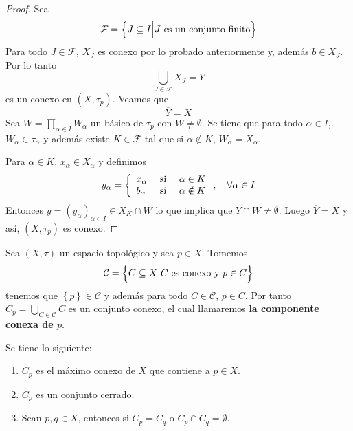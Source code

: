 \documentclass[12pt]{report}
\theoremstyle{largebreak}
\newcommand{\Cls}[1]{\ensuremath{\overline{#1}}}
\begin{document}
\begin{proof}
        Sea
        \begin{equation*}
            \mathcal{F}=\left\{J\subseteq I\Big|J\textup{ es un conjunto finito} \right\}
        \end{equation*}
        Para todo $J\in\mathcal{F}$, $X_J$ es conexo por lo probado anteriormente y, además $b\in X_J$. Por lo tanto
        \begin{equation*}
            \bigcup_{ J\in\mathcal{F}}X_J=Y
        \end{equation*}
        es un conexo en $(X,\tau_p)$. Veamos que
        \begin{equation*}
            \Cls{Y}=X
        \end{equation*}
        Sea $W=\prod_{\alpha\in I}W_\alpha$ un básico de $\tau_p$ con $W\neq\emptyset$. Se tiene que para todo $\alpha\in I$, $W_\alpha\in\tau_\alpha$ y además existe $K\in\mathcal{F}$ tal que si $\alpha\notin K$, $W_\alpha=X_\alpha$.

        Para $\alpha\in K$, $x_\alpha\in X_\alpha$ y definimos
        \begin{equation*}
            y_\alpha=\left\{
                \begin{array}{lcr}
                    x_\alpha & \textup{ si } & \alpha\in K\\
                    b_\alpha & \textup{ si } & \alpha\notin K\\
                \end{array}
            \right.,\quad\forall\alpha\in I
        \end{equation*}
        Entonces $y=(y_\alpha)_{\alpha\in I}\in X_K\cap W$ lo que implica que $Y\cap W\neq\emptyset$. Luego $\Cls{Y}=X$ y así, $(X,\tau_p)$ es conexo.
    \end{proof}

    \begin{mydef}
        Sea $(X,\tau)$ un espacio topológico y sea $p\in X$. Tomemos
        \begin{equation*}
            \mathcal{C}=\left\{C\subseteq X\Big|C\textup{ es conexo y }p\in C \right\}
        \end{equation*}
        tenemos que $\left\{p\right\}\in\mathcal{C}$ y además para todo $C\in\mathcal{C}$, $p\in C$. Por tanto $C_p=\bigcup_{ C\in\mathcal{C}}C$ es un conjunto conexo, el cual llamaremos \textbf{la componente conexa de $p$}.
    \end{mydef}

    \begin{obs}
        Se tiene lo siguiente:
        \begin{enumerate}
            \item $C_p$ es el máximo conexo de $X$ que contiene a $p\in X$.
            \item $C_p$ es un conjunto cerrado.
            \item Sean $p,q\in X$, entonces si $C_p=C_q$ o $C_p\cap C_q=\emptyset$.
        \end{enumerate}
    \end{obs}
\end{document}

